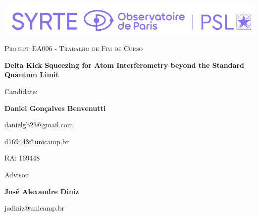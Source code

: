 \documentclass[english, a4paper, 11pt]{article}
\begin{document}
\thispagestyle{unicamp}

\begin{center}

    \includegraphics[width=0.7\linewidth]{logo-syrte.png}
    
\null\vfill

{\scshape\large Project EA006 - Trabalho de Fim de Curso \par}

\baselineskip

{\LARGE\bfseries Delta Kick Squeezing for Atom
Interferometry beyond the Standard
Quantum Limit\par}

\baselineskip

Candidate:\\[1ex]
{\large\bfseries Daniel Gonçalves Benvenutti\par}
{\large danielgb23@gmail.com\par}
{\large d169448@unicamp.br\par}
{\large RA: 169448\par}

\baselineskip

Advisor:\\[1ex]
{\large\bfseries José Alexandre Diniz\par}
{\large jadiniz@unicamp.br\par}

\end{center}

\vfill
\clearpage

%
%
%
%
%
%
%
%
\end{document}
